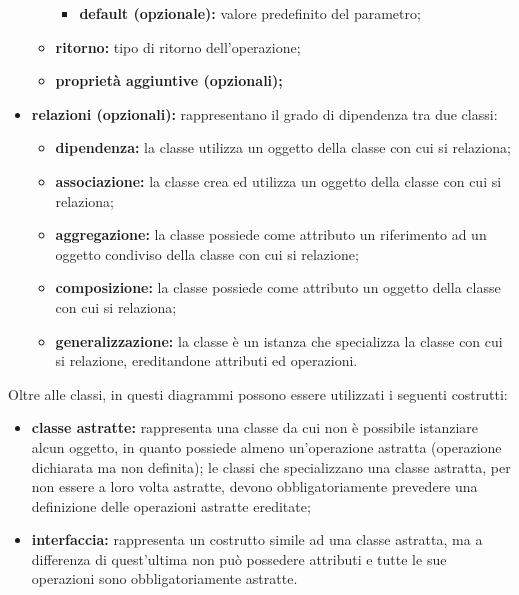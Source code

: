 \begin{itemize}
\begin{itemize}
\begin{itemize}
									\item \textbf{default (opzionale):} valore predefinito del parametro;
								\end{itemize}
								\item \textbf{ritorno:} tipo di ritorno dell'operazione;
								\item \textbf{proprietà aggiuntive (opzionali);}
							\end{itemize}
							\item \textbf{relazioni (opzionali):} rappresentano il grado di dipendenza tra due classi:
							\begin{itemize}
								\item \textbf{dipendenza:} la classe utilizza un oggetto della classe con cui si relaziona;
								\item \textbf{associazione:} la classe crea ed utilizza un oggetto della classe con cui si relaziona;
								\item \textbf{aggregazione:} la classe possiede come attributo un riferimento ad un oggetto condiviso della classe con cui si relazione;
								\item \textbf{composizione:} la classe possiede come attributo un oggetto della classe con cui si relaziona;
								\item \textbf{generalizzazione:} la classe è un istanza che specializza la classe con cui si relazione, ereditandone attributi ed operazioni.
							\end{itemize}
						\end{itemize}
						Oltre alle classi, in questi diagrammi possono essere utilizzati i seguenti costrutti:
						\begin{itemize}
							\item \textbf{classe astratte:} rappresenta una classe da cui non è possibile istanziare alcun oggetto, in quanto possiede almeno un'operazione astratta (operazione dichiarata ma non definita); le classi che specializzano una classe astratta, per non essere a loro volta astratte, devono obbligatoriamente prevedere una definizione delle operazioni astratte ereditate;
							\item \textbf{interfaccia:} rappresenta un costrutto simile ad una classe astratta, ma a differenza di quest'ultima non può possedere attributi e tutte le sue operazioni sono obbligatoriamente astratte.
						\end{itemize}
						
